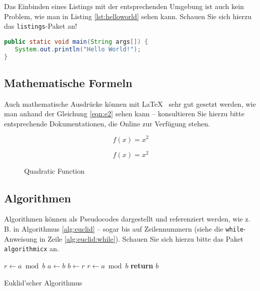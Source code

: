 Das Einbinden eines Listings mit der entsprechenden Umgebung ist auch kein Problem, wie man in Listing \ref{lst:helloworld} sehen kann. Schauen Sie sich hierzu das \texttt{listings}-Paket an!

\begin{lstlisting}[language=Java, caption={Hello World!}, label={lst:helloworld}]
public static void main(String args[]) {
   System.out.println("Hello World!");
}
\end{lstlisting}


\subsection{Mathematische Formeln}
Auch mathematische Ausdrücke können mit \LaTeX~ sehr gut gesetzt werden, wie man anhand der Gleichung \ref{eqn:e2} sehen kann -- konsultieren Sie hierzu bitte entsprechende Dokumentationen, die Online zur Verfügung stehen.

\begin{equation}
f(x)=x^2
\label{eqn:e2}
\end{equation}

\begin{figure}
\begin{equation}
f(x)=x^2
\end{equation}
\caption{Quadratic Function}
\end{figure}


\subsection{Algorithmen}
Algorithmen können als Pseudocodes dargestellt und referenziert werden, wie z.\,B. in Algorithmus \ref{alg:euclid} -- sogar bis auf Zeilennummern
(siehe die \texttt{while}-Anweisung in Zeile \ref{alg:euclid:while}). Schauen Sie sich hierzu bitte das Paket \texttt{algorithmicx} an.


\begin{algorithm}
\begin{algorithmic}[1]
   \State $r\gets a\bmod b$
    \label{alg:euclid:while}
      \State $a\gets b$
      \State $b\gets r$
      \State $r\gets a\bmod b$
   \EndWhile\label{euclidendwhile}
   \State \textbf{return} $b$
\EndProcedure
\end{algorithmic}
\caption{Euklid'scher Algorithmus}\label{alg:euclid}
\end{algorithm}


